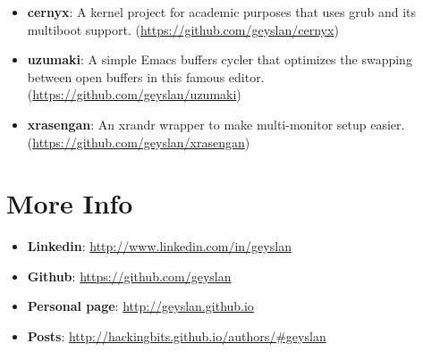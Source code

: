 \documentclass[margin]{res}
\begin{document}
\begin{resume}
\begin{itemize}
\item \textbf{cernyx}: A kernel project for academic purposes that
  uses grub and its multiboot support.\newline
  (\url{https://github.com/geyslan/cernyx})\vspace{1mm}

\item \textbf{uzumaki}: A simple Emacs buffers cycler that optimizes
  the swapping between open buffers in this famous editor.\newline
  (\url{https://github.com/geyslan/uzumaki})\vspace{1mm}

\item \textbf{xrasengan}: An xrandr wrapper to make multi-monitor
  setup easier.\newline
  (\url{https://github.com/geyslan/xrasengan})\vspace{1mm}
\end{itemize}

\section{More Info}
\begin{itemize}
\item \textbf{Linkedin}: \url{http://www.linkedin.com/in/geyslan}
\item \textbf{Github}: \url{https://github.com/geyslan}
\item \textbf{Personal page}: \url{http://geyslan.github.io}
\item \textbf{Posts}: \url{http://hackingbits.github.io/authors/#geyslan}
\end{itemize}

\end{resume}
\end{document}
